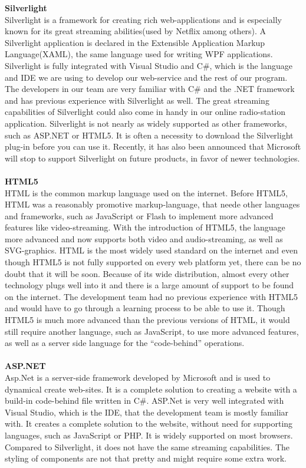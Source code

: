 \documentclass[a4paper,11pt,report]{article}
\begin{document}
{\textbf{Silverlight} \\
Silverlight is a framework for creating rich web-applications and is especially known for its great streaming abilities(used by Netflix among others). A Silverlight application is declared in the Extensible Application Markup Language(XAML), the same language used for writing WPF applications.  Silverlight is fully integrated with Visual Studio and C\#, which is the language and IDE we are using to develop our web-service and the rest of our program. The developers in our team are very familiar with C\# and the .NET framework and has previous experience with Silverlight as well. The great streaming capabilities of Silverlight could also come in handy in our online radio-station application. Silverlight is not nearly as widely supported as other frameworks, such as ASP.NET or HTML5. It is often a necessity to download the Silverlight plug-in before you can use it. Recently, it has also been announced that Microsoft will stop to support Silverlight on future products, in favor of newer technologies. \\ \\

\textbf{HTML5} \\
HTML is the common markup language used on the internet. Before HTML5, HTML was a reasonably promotive markup-language, that neede other languages and frameworks, such as JavaScript or Flash to implement more advanced features like video-streaming. With the introduction of HTML5, the language more advanced and now supports both video and audio-streaming, as well as SVG-graphics. HTML is the most widely used standard on the internet and even though HTML5 is not fully supported on every web platform yet, there can be no doubt that it will be soon. Because of its wide distribution, almost every other technology plugs well into it and there is a large amount of support to be found on the internet. The development team had no previous experience with HTML5 and would have to go through a learning process to be able to use it. Though HTML5 is much more advanced than the previous versions of HTML, it would still require another language, such as JavaScript, to use more advanced features, as well as a server side language for the “code-behind” operations. \\ \\

\textbf{ASP.NET} \\
Asp.Net is a server-side framework developed by Microsoft and is used to dynamical create web-sites. It is a complete solution to creating a website with a build-in code-behind file written in C\#. ASP.Net is very well integrated with Visual Studio, which is the IDE, that the development team is mostly familiar with. It creates a complete solution to the website, without need for supporting languages, such as JavaScript or PHP. It is widely supported on most browsers. Compared to Silverlight, it does not have the same streaming capabilities. The styling of components are not that pretty and might require some extra work. \\ \\

}
\end{document}

